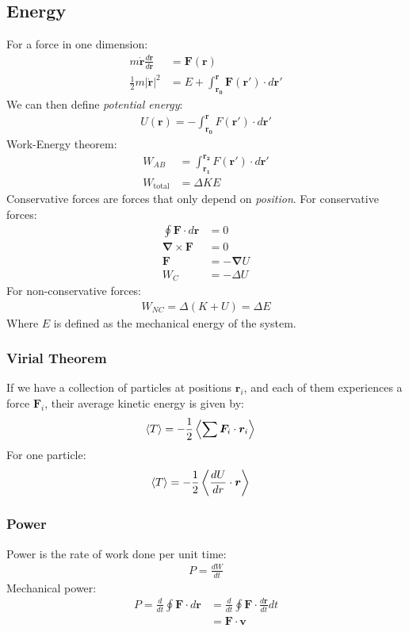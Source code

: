 \documentclass[11pt, letterpaper]{article}
\newcommand{\ve}[1]{
  \ensuremath{\bm{#1}}}	               %
\newcommand{\ave}[1]{
  \ensuremath{\langle #1 \rangle}}     %
\begin{document}
\begin{multicols*}{3}
\subsection{Energy}
For a force in one dimension:
\begin{align*}
  m \dot{\ve{r}} \frac{d\dot{\ve{r}}}{d\ve{r}} &= \ve{F}(\ve{r}) \\
  \frac{1}{2}m |\dot{\ve{r}}|^2 &= E + \int_{\ve{r_0}}^{\ve{r}} \ve{F}(\ve{r}')
  \cdot d\ve{r}'
\end{align*}
We can then define \emph{potential energy}:
\begin{align*}
  U(\ve{r}) = - \int_{\ve{r_0}}^{\ve{r}} F(\ve{r}') \cdot d\ve{r}'
\end{align*}
Work-Energy theorem:
\begin{align*}
  W_{AB} &= \int_{\ve{r_1}}^{\ve{r_2}} F(\ve{r}') \cdot d\ve{r}' \\
  W_{\text{total}} &= \Delta KE
\end{align*}
Conservative forces are forces that only depend on {\em position}. For
conservative forces:
\begin{align*}
  \oint \ve{F} \cdot d\ve{r} &= 0 \\
  \ve{\nabla} \times \ve{F} &= 0 \\
  \ve{F} &= - \ve{\nabla} U \\
  W_{C} &= -\Delta U
\end{align*}
For non-conservative forces:
\begin{align*}
  W_{NC} = \Delta(K+U) = \Delta E
\end{align*}
Where $E$ is defined as the mechanical energy of the system.
\subsubsection{Virial Theorem}
If we have a collection of particles at positions $\ve{r}_i$, and each of them
experiences a force $\ve{F}_i$, their average kinetic energy is given by:
\begin{align*}
  \ave{ T } &= -\frac{1}{2} \left\ave{ \sum \ve{F}_i \cdot \ve{r}_i \right}
\end{align*}
For one particle:
\begin{align*}
  \ave{ T } &= -\frac{1}{2} \left\ave{ \frac{dU}{dr} \cdot \ve{r} \right}
\end{align*}
\subsubsection{Power}
Power is the rate of work done per unit time:
\begin{align*}
  P=\frac{dW}{dt}
\end{align*}
Mechanical power:
\begin{align*}
  P=\frac{d}{dt}\oint \ve{F} \cdot d\ve{r}&=\frac{d}{dt}\oint \ve{F} \cdot \frac{d\ve{r}}{dt} dt\\
  &=\ve{F} \cdot \ve{v}
\end{align*}

\end{multicols*}
\end{document}
